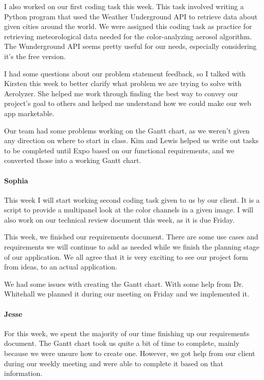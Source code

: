 \documentclass[onecolumn, draftclsnofoot,10pt, compsoc]{IEEEtran}
\begin{document}
\begin{flushleft}
I also worked on our first coding task this week. This task involved writing a Python program that used the Weather Underground API to retrieve data about given cities around the world. We were assigned this coding task as practice for retrieving meteorological data needed for the color-analyzing aerosol algorithm. The Wunderground API seems pretty useful for our needs, especially considering it's the free version.
 
 
I had some questions about our problem statement feedback, so I talked with Kirsten this week to better clarify what problem we are trying to solve with Aerolyzer. She helped me work through finding the best way to convey our project's goal to others and helped me understand how we could make our web app marketable.
 
Our team had some problems working on the Gantt chart, as we weren't given any direction on where to start in class. Kim and Lewis helped us write out tasks to be completed until Expo based on our functional requirements, and we converted those into a working Gantt chart.
 
\paragraph{Sophia}
 
This week I will start working second coding task given to us by our client. It is a script to provide a multipanel look at the color channels in a given image. I will also work on our technical review document this week, as it is due Friday.
 
 
This week, we finished our requirements document. There are some use cases and requirements we will continue to add as needed while we finish the planning stage of our application. We all agree that it is very exciting to see our project form from ideas, to an actual application.
 
 
We had some issues with creating the Gantt chart. With some help from Dr. Whitehall we planned it during our meeting on Friday and we implemented it.
 
\paragraph{Jesse}
 
For this week, we spent the majority of our time finishing up our requirements document. The Gantt chart took us quite a bit of time to complete, mainly because we were unsure how to create one. However, we got help from our client during our weekly meeting and were able to complete it based on that information.
 

\end{flushleft}
\end{document}
